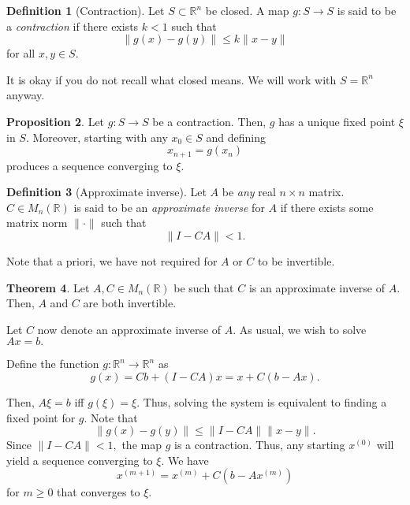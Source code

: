 \documentclass[12pt]{article}
\theoremstyle{definition}
\newtheorem{thm}{Theorem}
\newtheorem{prop}[thm]{Proposition}
\newtheorem{defn}[thm]{Definition}
\begin{document}
\begin{defn}[Contraction]
	Let $S \subset \mathbb{R}^n$ be closed. A map $g : S \to S$ is said to be a \emph{contraction} if there exists $k < 1$ such that
	\begin{equation*} 
		\|g(x) - g(y)\| \le k\|x - y\|
	\end{equation*}
	for all $x, y \in S.$
\end{defn}
It is okay if you do not recall what closed means. We will work with $S = \mathbb{R}^n$ anyway.
\begin{prop}
	Let $g : S \to S$ be a contraction. Then, $g$ has a unique fixed point $\xi$ in $S.$ Moreover, starting with any $x_0 \in S$ and defining 
	\begin{equation*} 
		x_{n + 1} = g(x_n)
	\end{equation*}
	produces a sequence converging to $\xi.$
\end{prop}

\begin{defn}[Approximate inverse]
	Let $A$ be \emph{any} real $n \times n$ matrix. $C \in M_n(\mathbb{R})$ is said to be an \emph{approximate inverse} for $A$ if there exists some matrix norm $\|\cdot\|$ such that
	\begin{equation*} 
		\|I - CA\| < 1.
	\end{equation*}
\end{defn}
Note that a priori, we have not required for $A$ or $C$ to be invertible.

\begin{thm}
	Let $A, C \in M_n(\mathbb{R})$ be such that $C$ is an approximate inverse of $A.$ Then, $A$ and $C$ are both invertible.
\end{thm}

Let $C$ now denote an approximate inverse of $A.$ As usual, we wish to solve $Ax = b.$

Define the function $g : \mathbb{R}^n \to \mathbb{R}^n$ as
\begin{equation*} 
	g(x) = Cb + (I - CA)x = x + C(b - Ax).
\end{equation*}

Then, $A\xi = b$ iff $g(\xi) = \xi.$ Thus, solving the system is equivalent to finding a fixed point for $g.$ Note that
\begin{equation*} 
	\|g(x) - g(y)\| \le \|I - CA\|\|x - y\|.
\end{equation*}
Since $\|I - CA\| < 1,$ the map $g$ is a contraction. Thus, any starting $x^{(0)}$ will yield a sequence converging to $\xi.$ We have
\begin{equation*} 
	x^{(m + 1)} = x^{(m)} + C(b - Ax^{(m)})
\end{equation*}
for $m \ge 0$ that converges to $\xi.$
\end{document}
